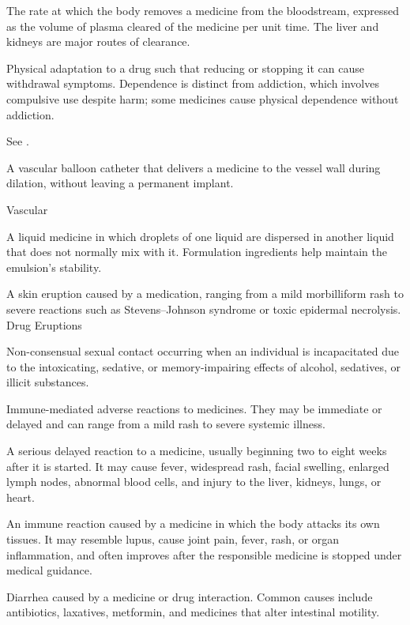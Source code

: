  The rate at which the body removes a medicine from the bloodstream, expressed as the volume of plasma cleared of the medicine per unit time. The liver and kidneys are major routes of clearance.

 Physical adaptation to a drug such that reducing or stopping it can cause withdrawal symptoms. Dependence is distinct from addiction, which involves compulsive use despite harm; some medicines cause physical dependence without addiction.

 See .

 A vascular balloon catheter that delivers a medicine to the vessel wall during dilation,
without leaving a permanent implant.

\synonyms
Vascular

 A liquid medicine in which droplets of one liquid are dispersed in another liquid that does not normally mix with it. Formulation ingredients help maintain the emulsion’s stability.

 A skin eruption caused by a medication, ranging from a mild morbilliform rash to severe reactions such as Stevens–Johnson syndrome or toxic epidermal necrolysis.
\synonyms
Drug Eruptions

 Non-consensual sexual contact occurring when an individual is incapacitated due to the intoxicating, sedative, or memory-impairing effects of alcohol, sedatives, or illicit substances.

 Immune-mediated adverse reactions to medicines. They may be immediate or delayed and can range from a mild rash to severe systemic illness.

 A serious delayed reaction to a medicine, usually beginning two to eight weeks after it is started. It may cause fever, widespread rash, facial swelling, enlarged lymph nodes, abnormal blood cells, and injury to the liver, kidneys, lungs, or heart.

 An immune reaction caused by a medicine in which the body attacks its own tissues. It may resemble lupus, cause joint pain, fever, rash, or organ inflammation, and often improves after the responsible medicine is stopped under medical guidance.

 Diarrhea caused by a medicine or drug interaction. Common causes include antibiotics, laxatives, metformin, and medicines that alter intestinal motility.

